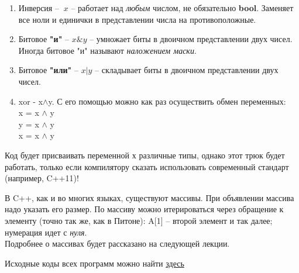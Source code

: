 \begin{lecture}[\lectureSubject]
\begin{lecSection}
\begin{enumerate}
			\item Инверсия -- $~x$ -- работает над \textit{любым} числом, не обязательно \textbf{bool}. Заменяет все ноли и единички в представлении числа на противоположные.
			\item Битовое \textbf{"и"} -- $x\& y$ -- умножает биты в двоичном представлении двух чисел. Иногда битовое "и" называют \textit{наложением маски}.
			\item Битовое \textbf{"или"} -- $x | y$ -- складывает биты в двоичном представлении двух чисел.
			\item xor - x$\wedge$y. С его помощью можно как раз осуществить обмен переменных: \\
			x = x $\wedge$ y \\
			y = x $\wedge$ y \\
			x = x $\wedge$ y \\
		\end{enumerate}
	\end{lecSection}
	\begin{lecSection}
		Код будет присваивать переменной х различные типы, однако этот трюк будет работать, только если компилятору сказать использовать современный стандарт (например, C++11)!
	\end{lecSection}
	
	\begin{lecSection}
		В C++, как и во многих языках, существуют массивы.
		При объявлении массива надо указать его размер. По массиву можно итерироваться через обращение к элементу (точно так же, как в Питоне): A[1] -- второй элемент и так далее; нумерация идет с \textit{нуля}.\\
		 Подробнее о массивах будет рассказано на следующей лекции.
	\end{lecSection}
	
			\begin{center}
				{Исходные коды всех программ можно найти \href{https://github.com/alekseik1/cpp\_lections\_2017/tree/master/lection\%202}{здесь}}
			\end{center}
\end{lecture}
